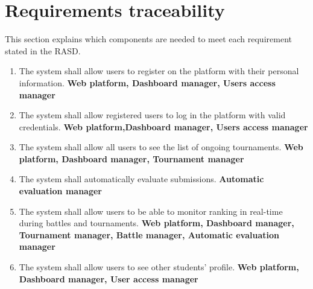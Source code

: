 \chapter{Requirements traceability}
This section explains which components are needed to meet each requirement stated in the RASD. 

\begin{enumerate}[label=\textbf{R.\arabic*}]
    \subsubsection*{Users}
    \item {} {The system shall allow users to register on the platform with their personal information.} \newline
    \textbf{Web platform, Dashboard manager, Users access manager}
    \item {} {The system shall allow registered users to log in the platform with valid credentials.} \newline
    \textbf{Web platform,Dashboard manager, Users access manager}
    \item {} {The system shall allow all users to see the list of ongoing tournaments.} \newline
    \textbf{Web platform, Dashboard manager, Tournament manager}
    \item {} {The system shall automatically evaluate submissions.} \newline
    \textbf{Automatic evaluation manager} 
    \item {} {The system shall allow users to be able to monitor ranking in real-time during battles and tournaments.} \newline
    \textbf{Web platform, Dashboard manager, Tournament manager, Battle manager, Automatic evaluation manager} 
    \item {} {The system shall allow users to see other students' profile.} \newline
    \textbf{Web platform, Dashboard manager, User access manager}
    

\end{enumerate}

